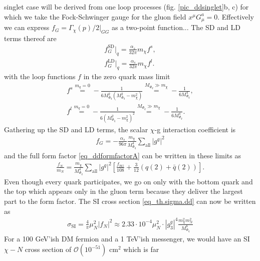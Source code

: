 singlet case will be derived from one loop processes (fig. \ref{pic_ddsinglet}b, c) 
for which we take the Fock-Schwinger gauge for the gluon
field $x^\mu G^a_\mu = 0$. Effectively we can express $f_G = \Gamma_\chi(p)/2|_{GG}$ as a two-point function... The SD and LD terms thereof are
\begin{align}
 f_G^\text{SD}|_q = \frac{\alpha_s}{32\pi} m_\chi f^s,\\
 f_G^\text{LD}|_q = \frac{\alpha_s}{32\pi} m_\chi f^l.
\end{align}
with the loop functions $f$ in the zero quark mass limit
\begin{align}
 f^s \stackrel{m_q=0}{=} - \frac{1}{6M_{\Phi_q}^2\left(M_{\Phi_q}^2-m_\chi^2\right)} \stackrel{M_{\Phi_q}\gg m_\chi}{=} -\frac{1}{6M_{\Phi_q}^4},\\
 f^l \stackrel{m_q=0}{=} - \frac{1}{6\left(M_{\Phi_q}^2-m_\chi^2\right)^2}  \stackrel{M_{\Phi_q}\gg m_\chi}{=} -\frac{1}{6M_{\Phi_q}^4}.
\end{align}
Gathering up the SD and LD terms, the scalar $\chi$-g interaction coefficient is
\begin{align}
 f_G = -\frac{\alpha_s}{96\pi} \frac{m_\chi}{M_{\Phi_q}^4} \sum\limits_{\text{all}} |g^q|^2
\end{align}
and the full form factor \eqref{eq_ddformfactorA} can be written in these limits as
\begin{align}
 \frac{f_N}{m_N} = \frac{m_\chi}{M_{\Phi_q}^4} \sum\limits_\text{all} \left|g^q\right|^2 \left[\frac{f_{TG}}{108} + \frac{3}{12}\left(q(2) + \bar q(2)\right)\right].
\end{align}
Even though every quark participates, we go on only with the bottom quark and the top which appears only in the gluon term because they deliver the
largest part to the form factor. The SI cross section \eqref{eq_th.sigma.dd} can now be written as
\begin{align}
 \sigma_\text{SI} = \frac{4}{\pi}\mu_N^2 \left| f_N \right| ^2 \approx 2.33\cdot 10^{-4} \mu_N^2 \cdot |g^q_3|^4 \frac{m_\chi^2 m_N^2}{M_{\Phi_q}^8}
 \label{eq_sigmaDDA}
\end{align}
For a 100 GeV'ish DM fermion and a 1 TeV'ish messenger, we would have an SI $\chi-N$ cross section of $\mathcal{O}(10^{-51})$ cm$^2$ which is far 
